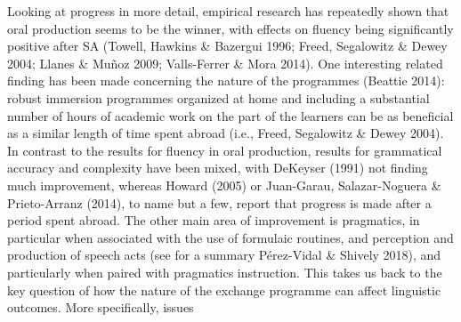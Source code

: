 \documentclass[12pt]{article}
\newenvironment{styleStandard}{\setlength\leftskip{0cm}\setlength\rightskip{0cm plus 1fil}\setlength\parindent{0cm}\setlength\parfillskip{0pt plus 1fil}\setlength\parskip{0in plus 1pt}\writerlistparindent\writerlistleftskip\leavevmode\normalfont\normalsize\writerlistlabel\ignorespaces}{\unskip\vspace{0.111in plus 0.0111in}\par}
\newcommand\writerlistleftskip{}
\newcommand\writerlistparindent{}
\newcommand\writerlistlabel{}
\begin{document}
\begin{styleStandard}
Looking at progress in more detail, empirical research has repeatedly shown that oral production seems to be the winner, with effects on fluency being significantly positive after SA (Towell, Hawkins \& Bazergui 1996; Freed, Segalowitz \& Dewey 2004; Llanes \& Muñoz 2009; Valls-Ferrer \& Mora 2014). One interesting related finding has been made concerning the nature of the programmes (Beattie 2014): robust immersion programmes organized at home and including a substantial number of hours of academic work on the part of the learners can be as beneficial as a similar length of time spent abroad (i.e., Freed, Segalowitz \& Dewey 2004). In contrast to the results for fluency in oral production, results for grammatical accuracy and complexity have been mixed, with DeKeyser (1991) not finding much improvement, whereas Howard (2005) or Juan-Garau, Salazar-Noguera \& Prieto-Arranz (2014), to name but a few, report that progress is made after a period spent abroad. The other main area of improvement is pragmatics, in particular when associated with the use of formulaic routines, and perception and production of speech acts (see for a summary Pérez-Vidal \& Shively 2018), and particularly when paired with pragmatics instruction. This takes us back to the key question of how the nature of the exchange programme can affect linguistic outcomes. More specifically, issues %
%

\end{styleStandard}
\end{document}
